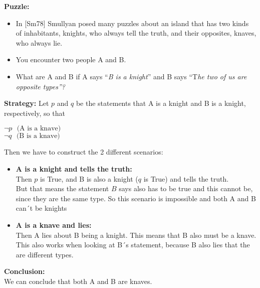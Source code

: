 \begin{tcolorbox}[title=Example 2: Raymond Smullyan´s Knights and Knaves]
\textbf{Puzzle:}  
\begin{itemize}
    \item In [Sm78] Smullyan posed many puzzles about an island that has two kinds of inhabitants,
knights, who always tell the truth, and their opposites, knaves, who always lie.
    \item You encounter two people A and B.
    \item What are A and B if A says “\textit{B is a knight}” and B says “T\textit{he two of us are
opposite types”?} 
\end{itemize}{}

\textbf{Strategy:}  
Let $p$ and $q$ be the statements that A is a knight and B is a knight, respectively, so that
\begin{center}
$\neg p \ \ \ \text{(A is a knave)} $ \\
$\neg q \ \ \ \text{(B is a knave)}$
\end{center}
Then we have to construct the 2 different scenarios:
\begin{itemize}
    \item \textbf{A is a knight and tells the truth:}\\
    Then $p$ is True, and B is also a knight ($q$ is True) and tells the truth. \\ But that means the statement $B$ says also has to be true and this cannot be, since they are the same type. So this scenario is impossible and both A and B can´t be knights
    \item \textbf{A is a knave and lies:} \\
    Then A lies about B being a knight. This means that B also must be a knave. This also works when looking at B´s statement, because B also lies that the are different types. 
\end{itemize}
\textbf{Conclusion:} \\
We can conclude that both A and B are
knaves.
 
\end{tcolorbox}


